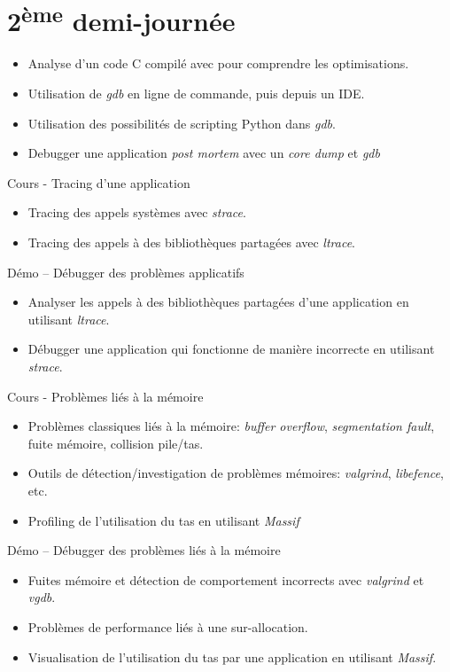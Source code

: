 \documentclass[a4paper,12pt,obeyspaces,spaces,hyphens]{article}
\begin{document}
\section{2\textsuperscript{ème} demi-journée}

{
  \begin{itemize}
  \item Analyse d'un code C compilé avec  pour
    comprendre les optimisations.
  \item Utilisation de {\em gdb} en ligne de commande, puis depuis un
    IDE.
  \item Utilisation des possibilités de scripting Python dans {\em gdb}.
  \item Debugger une application {\em post mortem} avec un {\em core
      dump} et {\em gdb}
  \end{itemize}
}

\feagendatwocolumn
{Cours - Tracing d'une application}
{
  \begin{itemize}
  \item Tracing des appels systèmes avec {\em strace}.
  \item Tracing des appels à des bibliothèques partagées avec {\em ltrace}.
  \end{itemize}
}
{Démo – Débugger des problèmes applicatifs}
{
  \begin{itemize}
  \item Analyser les appels à des bibliothèques partagées d'une
    application en utilisant {\em ltrace}.
  \item Débugger une application qui fonctionne de manière incorrecte
    en utilisant {\em strace}.
  \end{itemize}
}

\feagendatwocolumn
{Cours - Problèmes liés à la mémoire}
{
  \begin{itemize}
  \item Problèmes classiques liés à la mémoire: {\em buffer overflow},
    {\em segmentation fault}, fuite mémoire, collision pile/tas.
  \item Outils de détection/investigation de problèmes mémoires: {\em
      valgrind}, {\em libefence}, etc.
  \item Profiling de l'utilisation du tas en utilisant {\em Massif}
  \end{itemize}
}
{Démo – Débugger des problèmes liés à la mémoire}
{
  \begin{itemize}
  \item Fuites mémoire et détection de comportement incorrects avec
    {\em valgrind} et {\em vgdb}.
  \item Problèmes de performance liés à une sur-allocation.
  \item Visualisation de l'utilisation du tas par une application en
    utilisant {\em Massif}.
  \end{itemize}
}
\end{document}
